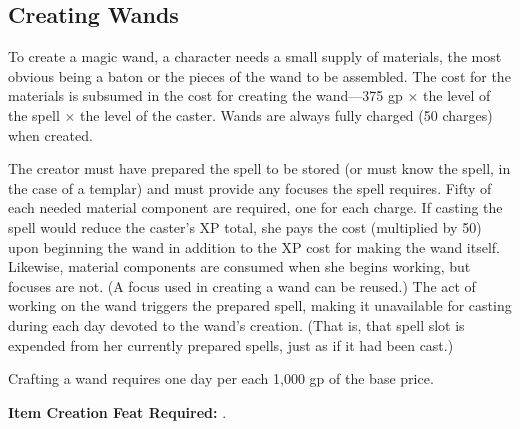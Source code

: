 \subsection{Creating Wands}
To create a magic wand, a character needs a small supply of materials, the most obvious being a baton or the pieces of the wand to be assembled. The cost for the materials is subsumed in the cost for creating the wand---375 gp $\times$ the level of the spell $\times$ the level of the caster. Wands are always fully charged (50 charges) when created.

The creator must have prepared the spell to be stored (or must know the spell, in the case of a templar) and must provide any focuses the spell requires. Fifty of each needed material component are required, one for each charge. If casting the spell would reduce the caster's XP total, she pays the cost (multiplied by 50) upon beginning the wand in addition to the XP cost for making the wand itself. Likewise, material components are consumed when she begins working, but focuses are not. (A focus used in creating a wand can be reused.) The act of working on the wand triggers the prepared spell, making it unavailable for casting during each day devoted to the wand's creation. (That is, that spell slot is expended from her currently prepared spells, just as if it had been cast.)

Crafting a wand requires one day per each 1,000 gp of the base price.

\textbf{Item Creation Feat Required:} .


